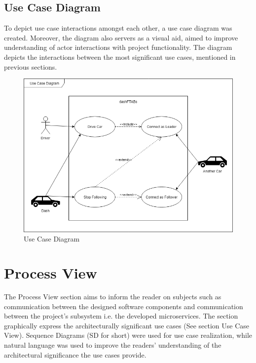 \documentclass[12pt]{article}
\begin{document}
\subsection{Use Case Diagram}
To depict use case interactions amongst each other, a use case diagram was created. Moreover, the diagram also servers as a visual aid, aimed to improve understanding of actor interactions with project functionality. The diagram depicts the interactions between the most significant use cases, mentioned in previous sections.\par

\begin{figure}[ht!]
\centering
\includegraphics[width=\linewidth]{Diagrams/UseCaseDiagram.png}
\caption{Use Case Diagram}
\label{fig:usecasediagram}
\end{figure}
\pagebreak

\section{Process View}
The Process View section aims to inform the reader on subjects such as communication between the designed software components and communication between the project's subsystem i.e. the developed microservices. The section graphically express the architecturally significant use cases (See section Use Case View). Sequence Diagrams (SD for short) were used for use case realization, while natural language was used to improve the readers’ understanding of the architectural significance the use cases provide.\par
\end{document}
